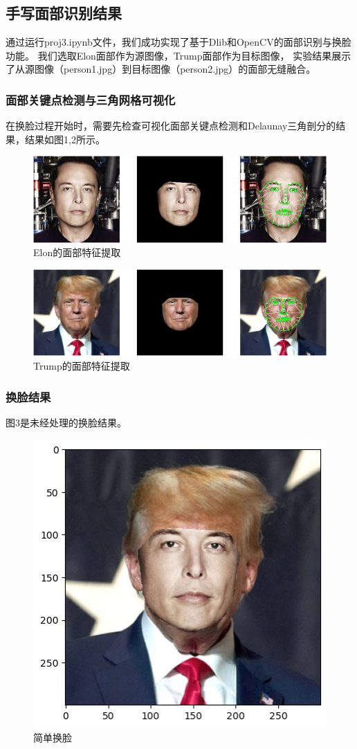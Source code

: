 
\subsection{手写面部识别结果}
通过运行proj3.ipynb文件，我们成功实现了基于Dlib和OpenCV的面部识别与换脸功能。
我们选取Elon面部作为源图像，Trump面部作为目标图像，
实验结果展示了从源图像（person1.jpg）到目标图像（person2.jpg）的面部无缝融合。

\subsubsection{面部关键点检测与三角网格可视化}
在换脸过程开始时，需要先检查可视化面部关键点检测和Delaunay三角剖分的结果，结果如图1,2所示。
\begin{figure}
	\centering
	\includegraphics[width=0.7\linewidth]{image/Elon}
	\caption{Elon的面部特征提取}
	\label{图1：}
\end{figure}
\begin{figure}
	\centering
	\includegraphics[width=0.7\linewidth]{image/Trump}
	\caption{Trump的面部特征提取}
	\label{图2：}
\end{figure}


\subsubsection{换脸结果}
图3是未经处理的换脸结果。
\begin{figure}
	\centering
	\includegraphics[width=0.7\linewidth]{image/traditional_swap}
	\caption{简单换脸}
	\label{图3：}
\end{figure}

